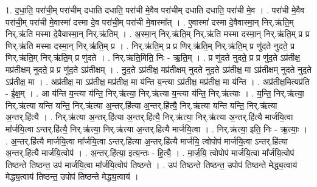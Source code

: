 \documentclass[17pt]{extarticle}
\begin{document}
1. द॒धा॒ति॒ परा॑ची॒म् परा॑चीम् दधाति दधाति॒ परा॑ची मे॒वैव परा॑चीम् दधाति दधाति॒ परा॑ची मे॒व । . परा॑ची मे॒वैव परा॑ची॒म् परा॑ची मे॒वास्मा॑ दस्मा दे॒व परा॑ची॒म् परा॑ची मे॒वास्मा᳚त् । . ए॒वास्मा॑ दस्मा दे॒वैवास्मा॒न् निर्.ऋ॑ति॒म् निर्.ऋ॑ति मस्मा दे॒वैवास्मा॒न् निर्.ऋ॑तिम् । . अ॒स्मा॒न् निर्.ऋ॑ति॒म् निर्.ऋ॑ति मस्मा दस्मा॒न् निर्.ऋ॑ति॒म् प्र प्र णिर्.ऋ॑ति मस्मा दस्मा॒न् निर्.ऋ॑ति॒म् प्र । . निर्.ऋ॑ति॒म् प्र प्र णिर्.ऋ॑ति॒म् निर्.ऋ॑ति॒म् प्र णु॑दते नुदते॒ प्र णिर्.ऋ॑ति॒म् निर्.ऋ॑ति॒म् प्र णु॑दते । . निर्.ऋ॑ति॒मिति॒ निः - ऋ॒ति॒म् । . प्र णु॑दते नुदते॒ प्र प्र णु॑द॒ते ऽप्र॑तीक्ष॒ मप्र॑तीक्षम् नुदते॒ प्र प्र णु॑द॒ते ऽप्र॑तीक्षम् । . नु॒द॒ते ऽप्र॑तीक्ष॒ मप्र॑तीक्षम् नुदते नुद॒ते ऽप्र॑तीक्ष॒ मा ऽप्र॑तीक्षम् नुदते नुद॒ते ऽप्र॑तीक्ष॒ मा । . अप्र॑तीक्ष॒ मा ऽप्र॑तीक्ष॒ मप्र॑तीक्ष॒ मा य॑न्ति य॒न्त्या ऽप्र॑तीक्ष॒ मप्र॑तीक्ष॒ मा य॑न्ति । . अप्र॑तीक्ष॒मित्यप्र॑ति - ई॒क्ष॒म् । . आ य॑न्ति य॒न्त्या य॑न्ति॒ निर्.ऋ॑त्या॒ निर्.ऋ॑त्या य॒न्त्या य॑न्ति॒ निर्.ऋ॑त्याः । . य॒न्ति॒ निर्.ऋ॑त्या॒ निर्.ऋ॑त्या यन्ति यन्ति॒ निर्.ऋ॑त्या अ॒न्तर्.हि॑त्या अ॒न्तर्.हि॑त्यै॒ निर्.ऋ॑त्या यन्ति यन्ति॒ निर्.ऋ॑त्या अ॒न्तर्.हि॑त्यै । . निर्.ऋ॑त्या अ॒न्तर्.हि॑त्या अ॒न्तर्.हि॑त्यै॒ निर्.ऋ॑त्या॒ निर्.ऋ॑त्या अ॒न्तर्.हि॑त्यै मार्जयि॒त्वा मा᳚र्जयि॒त्वा ऽन्तर्.हि॑त्यै॒ निर्.ऋ॑त्या॒ निर्.ऋ॑त्या अ॒न्तर्.हि॑त्यै मार्जयि॒त्वा । . निर्.ऋ॑त्या॒ इति॒ निः - ऋ॒त्याः॒ । . अ॒न्तर्.हि॑त्यै मार्जयि॒त्वा मा᳚र्जयि॒त्वा ऽन्तर्.हि॑त्या अ॒न्तर्.हि॑त्यै मार्जयि॒ त्वोपोप॑ मार्जयि॒त्वा ऽन्तर्.हि॑त्या अ॒न्तर्.हि॑त्यै मार्जयि॒त्वोप॑ । . अ॒न्तर्.हि॑त्या॒ इत्य॒न्तः - हि॒त्यै॒ । . मा॒र्ज॒यि॒ त्वोपोप॑ मार्जयि॒त्वा मा᳚र्जयि॒त्वोप॑ तिष्ठन्ते तिष्ठन्त॒ उप॑ मार्जयि॒त्वा मा᳚र्जयि॒त्वोप॑ तिष्ठन्ते । . उप॑ तिष्ठन्ते तिष्ठन्त॒ उपोप॑ तिष्ठन्ते मेद्ध्य॒त्वाय॑ मेद्ध्य॒त्वाय॑ तिष्ठन्त॒ उपोप॑ तिष्ठन्ते मेद्ध्य॒त्वाय॑ । \newline
\end{document}
